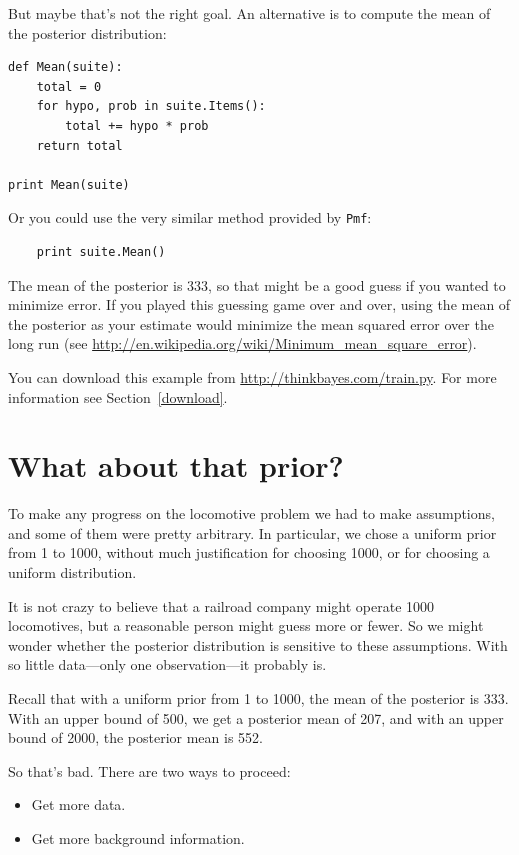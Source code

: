 \documentclass[12pt]{book}
\begin{document}
But maybe that's
not the right goal.  An alternative is to compute the
mean of the posterior distribution:

\begin{verbatim}
def Mean(suite):
    total = 0
    for hypo, prob in suite.Items():
        total += hypo * prob
    return total

print Mean(suite)
\end{verbatim}

Or you could use the very similar method provided by {\tt Pmf}:

\begin{verbatim}
    print suite.Mean()
\end{verbatim}

The mean of the posterior is 333, so that might be a
good guess if you wanted to minimize error.  If you played this
guessing game over and over, using the mean of the posterior as your
estimate would minimize the mean squared error over the long run (see
\url{http://en.wikipedia.org/wiki/Minimum_mean_square_error}).

You can download this example from \url{http://thinkbayes.com/train.py}.
  For more information
see Section~\ref{download}.

\section{What about that prior?}

To make any progress on the locomotive problem we had to make
assumptions, and some of them were pretty arbitrary.  In
particular, we chose a uniform prior from 1 to 1000, without
much justification for choosing 1000, or for choosing a uniform
distribution.

It is not crazy to believe that a railroad company might operate 1000
locomotives, but a reasonable person might guess more or fewer.  So we
might wonder whether the posterior distribution is sensitive to these
assumptions.  With so little data---only one observation---it probably
is.

Recall that with a uniform prior from 1 to 1000, the mean of
the posterior is 333.  With an upper bound of 500, we get a
posterior mean of 207, and with an upper bound of 2000,
the posterior mean is 552.

So that's bad.  There are two ways to proceed:

\begin{itemize}

\item Get more data.

\item Get more background information.

\end{itemize}
\end{document}
